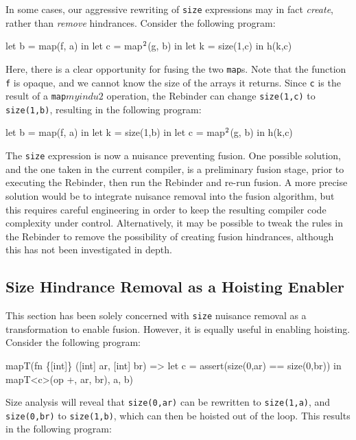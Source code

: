In some cases, our aggressive rewriting of \texttt{size} expressions
may in fact \textit{create}, rather than \textit{remove} hindrances.
Consider the following program:

\begin{colorcode}
let b = map(f, a) in
let c = map\(^{2}\)(g, b) in
let k = size(1,c) in
h(k,c)
\end{colorcode}

Here, there is a clear opportunity for fusing the two \texttt{map}s.
Note that the function \texttt{f} is opaque, and we cannot know the
size of the arrays it returns.  Since \texttt{c} is the result of a
\texttt{map\(myindu{2}\)} operation, the Rebinder can change
\texttt{size(1,c)} to \texttt{size(1,b)}, resulting in the following
program:

\begin{colorcode}
let b = map(f, a) in
let k = size(1,b) in
let c = map\(^{2}\)(g, b) in
h(k,c)
\end{colorcode}

The \texttt{size} expression is now a nuisance preventing fusion.  One
possible solution, and the one taken in the current \LO{} compiler, is
a preliminary fusion stage, prior to executing the Rebinder, then run
the Rebinder and re-run fusion.  A more precise solution would be to
integrate nuisance removal into the fusion algorithm, but this
requires careful engineering in order to keep the resulting compiler
code complexity under control.  Alternatively, it may be possible to
tweak the rules in the Rebinder to remove the possibility of creating
fusion hindrances, although this has not been investigated in depth.

\subsection{Size Hindrance Removal as a Hoisting Enabler}
\label{sec:hoisting-enabler}

This section has been solely concerned with \texttt{size} nuisance
removal as a transformation to enable fusion.  However, it is equally
useful in enabling hoisting.  Consider the following program:

\begin{colorcode}
mapT(fn \{[int]\} ([int] ar, [int] br) =>
       let c = assert(size(0,ar) == size(0,br)) in
       mapT<c>(op +, ar, br),
     a, b)
\end{colorcode}

Size analysis will reveal that \texttt{size(0,ar)} can be rewritten to
\texttt{size(1,a)}, and \texttt{size(0,br)} to \texttt{size(1,b)},
which can then be hoisted out of the loop.  This results in the
following program:

